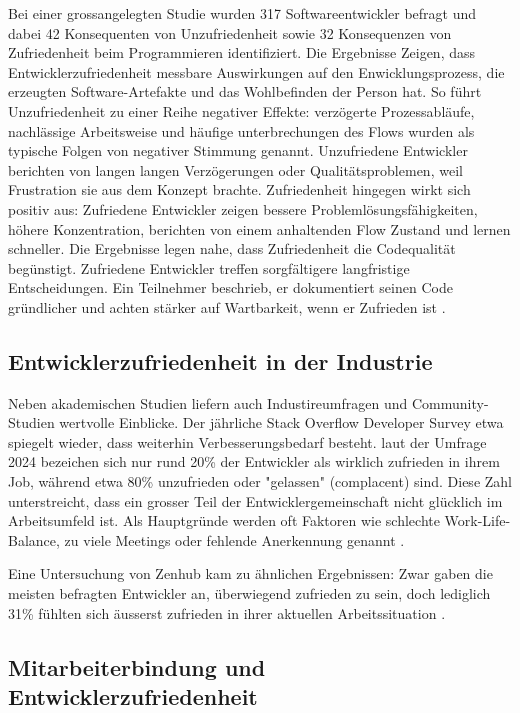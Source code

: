 \documentclass[12pt,a4paper]{report}
\begin{document}
Bei einer grossangelegten Studie wurden 317 Softwareentwickler befragt und dabei 42 Konsequenten von Unzufriedenheit sowie
32 Konsequenzen von Zufriedenheit beim Programmieren identifiziert. Die Ergebnisse Zeigen, dass Entwicklerzufriedenheit messbare
Auswirkungen auf den Enwicklungsprozess, die erzeugten Software-Artefakte und das Wohlbefinden der Person hat. So führt
Unzufriedenheit zu einer Reihe negativer Effekte: verzögerte Prozessabläufe, nachlässige Arbeitsweise und häufige unterbrechungen
des Flows wurden als typische Folgen von negativer Stimmung genannt. Unzufriedene Entwickler berichten von langen langen
Verzögerungen oder Qualitätsproblemen, weil Frustration sie aus dem Konzept brachte. Zufriedenheit hingegen wirkt sich positiv
aus: Zufriedene Entwickler zeigen bessere Problemlösungsfähigkeiten, höhere Konzentration, berichten von einem anhaltenden Flow
Zustand und lernen schneller. Die Ergebnisse legen nahe, dass Zufriedenheit die Codequalität begünstigt. Zufriedene Entwickler
treffen sorgfältigere langfristige Entscheidungen. Ein Teilnehmer beschrieb, er dokumentiert seinen Code gründlicher und achten
stärker auf Wartbarkeit, wenn er Zufrieden ist \cite{graziotin_what_2018}.

\subsection{Entwicklerzufriedenheit in der Industrie}

Neben akademischen Studien liefern auch Industireumfragen und Community-Studien wertvolle Einblicke. Der jährliche Stack Overflow
Developer Survey etwa spiegelt wieder, dass weiterhin Verbesserungsbedarf besteht. laut der Umfrage 2024 bezeichen sich nur rund 
20\% der Entwickler als wirklich zufrieden in ihrem Job, während etwa 80\% unzufrieden oder "gelassen" (complacent) sind. Diese Zahl
unterstreicht, dass ein grosser Teil der Entwicklergemeinschaft nicht glücklich im Arbeitsumfeld ist. Als Hauptgründe werden oft
Faktoren wie schlechte Work-Life-Balance, zu viele Meetings oder fehlende Anerkennung genannt \cite{stackoverflow_survey_2025}. 

Eine Untersuchung von Zenhub kam zu ähnlichen Ergebnissen: Zwar gaben die meisten befragten Entwickler an, überwiegend zufrieden
zu sein, doch lediglich 31\% fühlten sich äusserst zufrieden in ihrer aktuellen Arbeitssituation \cite{zenhub_2022_nodate}. 

\subsection{Mitarbeiterbindung und Entwicklerzufriedenheit}
\end{document}
